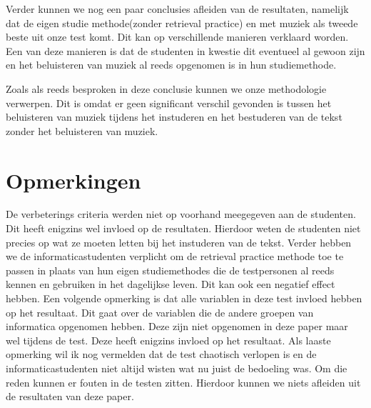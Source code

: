 \documentclass{hogent-article}
\begin{document}
	Verder kunnen we nog een paar conclusies afleiden van de resultaten, namelijk dat de eigen studie methode(zonder retrieval practice) en met muziek als tweede beste uit onze test komt. Dit kan op verschillende manieren verklaard worden. Een van deze manieren is dat de studenten in kwestie dit eventueel al gewoon zijn en het beluisteren van muziek al reeds opgenomen is in hun studiemethode. 
	
	Zoals als reeds besproken in deze conclusie kunnen we onze methodologie verwerpen. Dit is omdat er geen significant verschil gevonden is tussen het beluisteren van muziek tijdens het instuderen en het bestuderen van de tekst zonder het beluisteren van muziek.
	
	
	\section{Opmerkingen}
	De verbeterings criteria werden niet op voorhand meegegeven aan de studenten. Dit heeft enigzins wel invloed op de resultaten. Hierdoor weten de studenten niet precies op wat ze moeten letten bij het instuderen van de tekst.
	Verder hebben we de informaticastudenten verplicht om de retrieval practice methode toe te passen in plaats van hun eigen studiemethodes die de testpersonen al reeds kennen en gebruiken in het dagelijkse leven. Dit kan ook een negatief effect hebben.
	Een volgende opmerking is dat alle variablen in deze test invloed hebben op het resultaat. Dit gaat over de variablen die de andere groepen van informatica opgenomen hebben. Deze zijn niet opgenomen in deze paper maar wel tijdens de test. Deze heeft enigzins invloed op het resultaat.
	Als laaste opmerking wil ik nog vermelden dat de test chaotisch verlopen is en de informaticastudenten niet altijd wisten wat nu juist de bedoeling was. Om die reden kunnen er fouten in de testen zitten. 
	Hierdoor kunnen we niets afleiden uit de resultaten van deze paper.
	
	
	\printbibliography[heading=bibintoc]
	
\end{document}
